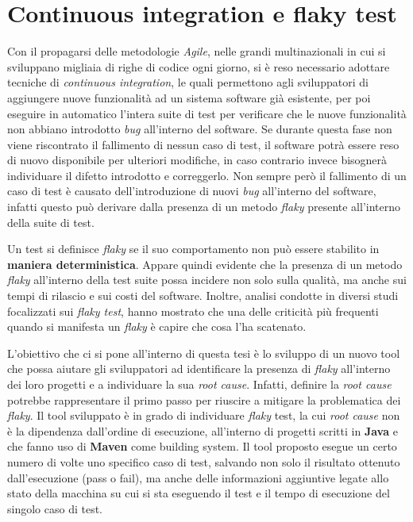 \section*{Continuous integration e flaky test}
Con il propagarsi delle metodologie \emph{Agile}, nelle grandi multinazionali in cui
si sviluppano migliaia di righe di codice ogni giorno, si è reso necessario adottare tecniche di \emph{continuous integration}, le quali permettono agli sviluppatori di
aggiungere nuove funzionalità ad un sistema software già esistente, per poi eseguire
in automatico l’intera suite di test per verificare che le nuove funzionalità non abbiano introdotto \emph{bug} all’interno del software. Se durante questa fase non viene riscontrato il fallimento di nessun caso di test, il software potrà essere reso di nuovo
disponibile per ulteriori modifiche, in caso contrario invece bisognerà individuare il difetto introdotto e correggerlo. Non sempre però il fallimento di un caso di test è causato dell’introduzione di nuovi \emph{bug} all’interno del software, infatti questo può
derivare dalla presenza di un metodo \emph{flaky} presente all’interno della suite di test.

Un test si definisce \emph{flaky} se il suo comportamento non può essere stabilito in \textbf{maniera deterministica}. Appare quindi evidente che la presenza di un metodo \emph{flaky}
all’interno della test suite possa incidere non solo sulla qualità, ma anche sui tempi di rilascio e sui costi del software. Inoltre, analisi condotte in diversi studi
focalizzati sui \emph{flaky test}, hanno mostrato che una delle criticità più frequenti quando si manifesta un \emph{flaky} è capire che cosa l’ha scatenato.

L’obiettivo che ci si pone all’interno di questa tesi è lo sviluppo di un nuovo tool che possa aiutare gli sviluppatori ad identificare la presenza di \emph{flaky} all’interno
dei loro progetti e a individuare la sua \emph{root cause}. Infatti, definire la \emph{root cause}
potrebbe rappresentare il primo passo per riuscire a mitigare la problematica dei
\emph{flaky}. Il tool sviluppato è in grado di individuare \emph{flaky} test, la cui \emph{root cause} non è
la dipendenza dall’ordine di esecuzione, all’interno di progetti scritti in \textbf{Java} e che fanno uso di \textbf{Maven} come building system. Il tool proposto esegue un certo numero
di volte uno specifico caso di test, salvando non solo il risultato ottenuto dall’esecuzione (pass o fail), ma anche delle informazioni aggiuntive legate allo stato della macchina su cui si sta eseguendo il test e il tempo di esecuzione del singolo caso di test.

